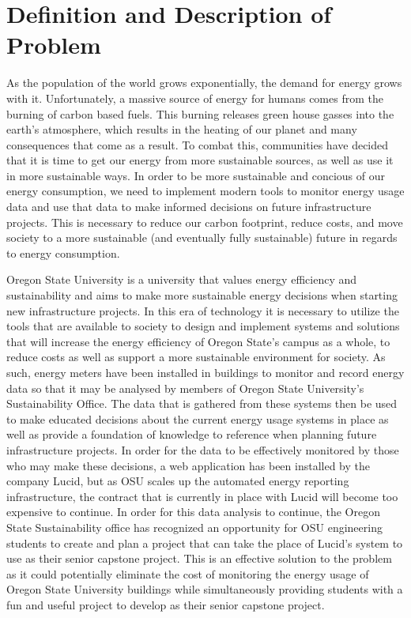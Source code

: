 \documentclass[onecolumn, draftclsnofoot,10pt, compsoc]{IEEEtran}
\begin{document}
\section{Definition and Description of Problem}

	As the population of the world grows exponentially, the demand for energy grows with it. Unfortunately, a massive source of energy for humans comes from
	the burning of carbon based fuels. This burning releases green house gasses into the earth's atmosphere, which results in the heating of our planet and
	many consequences that come as a result. To combat this, communities have decided that it is time to get our energy from more sustainable sources, as well
	as use it in more sustainable ways. In order to be more sustainable and concious of our energy consumption, we need to implement modern tools to monitor
	energy usage data and use that data to make informed decisions on future infrastructure projects. This is necessary to reduce our carbon footprint, reduce costs, and move
	society to a more sustainable (and eventually fully sustainable) future in regards to energy consumption. 
	
	Oregon State University is a university that values energy efficiency and sustainability and aims to make more sustainable energy decisions when starting new infrastructure projects.
	In this era of technology it is necessary to utilize the tools that are available to society to design and implement systems and solutions that will increase the energy efficiency of Oregon State's 
	campus as a whole, to reduce costs as well as support a more sustainable environment for society. As such, energy meters have been installed in buildings 
	to monitor and record energy data so that it may be analysed by members of Oregon State University's Sustainability Office. The data that is gathered 
	from these systems then be used to make educated decisions about the current energy usage systems in place as well as provide a foundation of knowledge 
	to reference when planning future infrastructure projects. In order for the data to be effectively monitored by those who may make these decisions, a web 
	application has been installed by the company Lucid, but as OSU scales up the automated energy reporting infrastructure, the contract that is currently in place
	with Lucid will become too expensive to continue. In order for this data analysis to continue, the Oregon State Sustainability office has recognized an 
	opportunity for OSU engineering students to create and plan a project that can take the place of Lucid's system to use as their senior capstone project. 
	This is an effective solution to the problem as it could potentially eliminate the cost of monitoring the energy usage of Oregon State University buildings
	while simultaneously providing students with a fun and useful project to develop as their senior capstone project.
\end{document}
